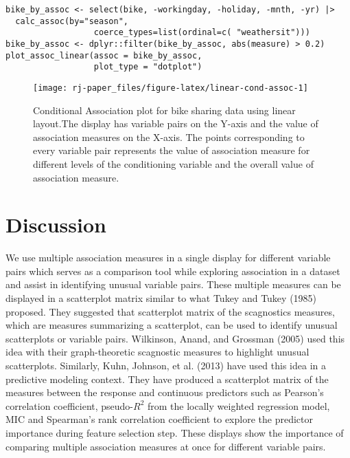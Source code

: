 \begin{verbatim}
bike_by_assoc <- select(bike, -workingday, -holiday, -mnth, -yr) |>
  calc_assoc(by="season", 
                  coerce_types=list(ordinal=c( "weathersit")))
bike_by_assoc <- dplyr::filter(bike_by_assoc, abs(measure) > 0.2)
plot_assoc_linear(assoc = bike_by_assoc,
                  plot_type = "dotplot")
\end{verbatim}

\begin{figure}

\texttt{[image: rj-paper\_files/figure-latex/linear-cond-assoc-1]} \hfill{}

\caption{Conditional Association plot for bike sharing data using linear layout.The display has variable pairs on the Y-axis and the value of association measures on the X-axis. The points corresponding to every variable pair represents the value of association measure for different levels of the conditioning variable and the overall value of association measure.}\label{fig:linear-cond-assoc}
\end{figure}

\hypertarget{discussion}{%
\section{Discussion}\label{discussion}}

We use multiple association measures in a single display for different variable pairs which serves as a comparison tool while exploring association in a dataset and assist in identifying unusual variable pairs. These multiple measures can be displayed in a scatterplot matrix similar to what Tukey and Tukey (1985) proposed. They suggested that scatterplot matrix of the scagnostics measures, which are measures summarizing a scatterplot, can be used to identify unusual scatterplots or variable pairs. Wilkinson, Anand, and Grossman (2005) used this idea with their graph-theoretic scagnostic measures to highlight unusual scatterplots. Similarly, Kuhn, Johnson, et al. (2013) have used this idea in a predictive modeling context. They have produced a scatterplot matrix of the measures between the response and continuous predictors such as Pearson's correlation coefficient, pseudo-\(R^2\) from the locally weighted regression model, MIC and Spearman's rank correlation coefficient to explore the predictor importance during feature selection step. These displays show the importance of comparing multiple association measures at once for different variable pairs.

